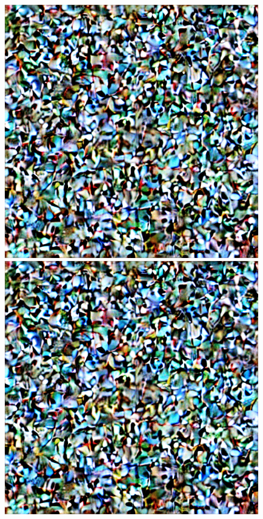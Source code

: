 \begin{figure}[h]
    \centering
    \begin{minipage}{0.10\textwidth}  %
        \centering
        \includegraphics[width=\textwidth]{images/diffusion_models/noise_to_image_gif/0.png}
    \end{minipage}
    \begin{minipage}{0.10\textwidth}
        \centering
        \includegraphics[width=\textwidth]{images/diffusion_models/noise_to_image_gif/1.png}

\end{minipage}
\end{figure}
